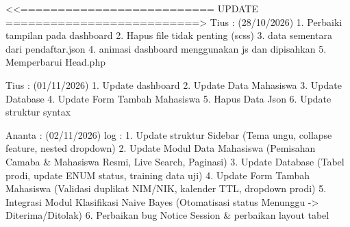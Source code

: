 <<========================== UPDATE ==========================>
Tius : (28/10/2026)
        1. Perbaiki tampilan pada dashboard
        2. Hapus file tidak penting (scss)
        3. data sementara dari pendaftar.json
        4. animasi dashboard menggunakan js dan dipisahkan
        5. Memperbarui Head.php

Tius : (01/11/2026)
        1. Update dashboard
        2. Update Data Mahasiswa
        3. Update Database
        4. Update Form Tambah Mahasiswa
        5. Hapus Data Json
        6. Update struktur syntax

Ananta : (02/11/2026)
        log :
        1. Update struktur Sidebar (Tema ungu, collapse feature, nested dropdown)
        2. Update Modul Data Mahasiswa (Pemisahan Camaba & Mahasiswa Resmi, Live Search, Paginasi)
        3. Update Database (Tabel prodi, update ENUM status, training data uji)
        4. Update Form Tambah Mahasiswa (Validasi duplikat NIM/NIK, kalender TTL, dropdown prodi)
        5. Integrasi Modul Klasifikasi Naive Bayes (Otomatisasi status Menunggu -> Diterima/Ditolak)
        6. Perbaikan bug Notice Session & perbaikan layout tabel

